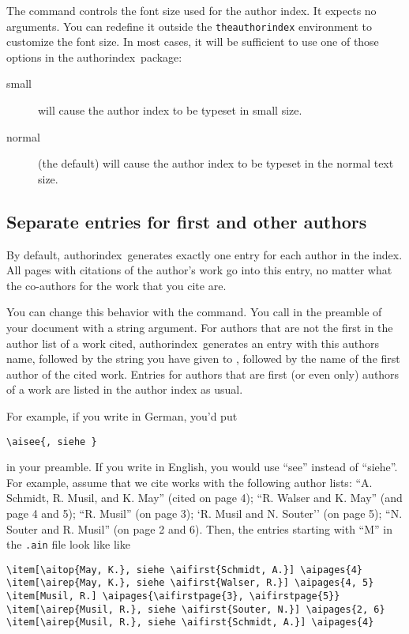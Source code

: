 \documentclass[a4paper]{article}
\newcommand{\package}[1]{\textsf{#1}}
\newcommand{\authorindex}{\package{authorindex}}
\newcommand{\file}[1]{\texttt{#1}}
\newcommand{\fnext}[1]{\file{.#1}}
\newcommand{\ltxinp}[1]{\texttt{\string#1}}
\begin{document}
The command \ltxinp{\aisize} controls the font size used for the author index.
It expects no arguments. You can redefine it outside the
\ltxinp{theauthorindex} environment to customize the font size. In most cases,
it will be sufficient to use one of those options in the \authorindex\ package:
\begin{description}
\item[small] will cause the author index to be typeset in small size.
\item[normal] (the default) will cause the author index to be typeset in the
  normal text size.
\end{description}


\subsection{Separate entries for first and other authors}
\label{sec:firstandothers}

By default, \authorindex\ generates exactly one entry for each author in the
index.  All pages with citations of the author's work go into this entry, no
matter what the co-authors for the work that you cite are.

You can change this behavior with the \ltxinp{\aisee} command.  You call
\ltxinp{\aisee} in the preamble of your document with a string argument.  For
authors that are not the first in the author list of a work cited,
\authorindex\ generates an entry with this authors name, followed by the string
you have given to \ltxinp{\aisee}, followed by the name of the first author of
the cited work.  Entries for authors that are first (or even only) authors of a
work are listed in the author index as usual.

For example, if you write in German, you'd put
\begin{verbatim}
\aisee{, siehe }
\end{verbatim}
in your preamble.  If you write in English, you would use ``see'' instead of
``siehe''.  For example, assume that we cite works with the following author
lists: ``A.  Schmidt, R. Musil, and K. May'' (cited on page 4); ``R.  Walser
and K. May'' (and page 4 and 5); ``R.  Musil'' (on page 3); `R. Musil and N.
Souter'' (on page 5); ``N. Souter and R.  Musil'' (on page 2 and 6).  Then, the
entries starting with ``M'' in the \fnext{ain} file look like like
\begin{verbatim}
\item[\aitop{May, K.}, siehe \aifirst{Schmidt, A.}] \aipages{4}
\item[\airep{May, K.}, siehe \aifirst{Walser, R.}] \aipages{4, 5}
\item[Musil, R.] \aipages{\aifirstpage{3}, \aifirstpage{5}}
\item[\airep{Musil, R.}, siehe \aifirst{Souter, N.}] \aipages{2, 6}
\item[\airep{Musil, R.}, siehe \aifirst{Schmidt, A.}] \aipages{4}
\end{verbatim}
\end{document}
